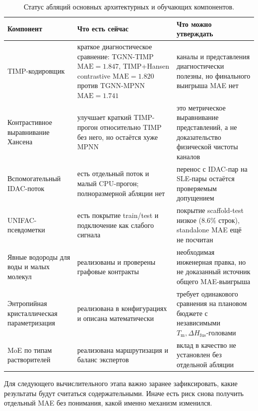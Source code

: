 \documentclass[11pt]{article}
\newcommand{\mae}{\mathrm{MAE}}
\newcommand{\Tm}{T_{\mathrm m}}
\newcommand{\dHfus}{\Delta H_{\mathrm{fus}}}
\theoremstyle{definition}
\begin{document}
\begin{table}[H]
\centering
\caption{Статус абляций основных архитектурных и обучающих компонентов.}
\label{tab:ablation-status}
\small
\begin{tabularx}{\textwidth}{P{0.25\textwidth}P{0.24\textwidth}Y}
\toprule
Компонент & Что есть сейчас & Что можно утверждать \\
\midrule
TIMP-кодировщик & краткое диагностическое сравнение: TGNN-TIMP $\mae=1.847$, TIMP+Hansen contrastive $\mae=1.820$ против TGNN-MPNN $\mae=1.741$ & каналы и представления диагностически полезны, но финального выигрыша MAE нет \\
Контрастивное выравнивание Хансена & улучшает краткий TIMP-прогон относительно TIMP без него, но остаётся хуже MPNN & это метрическое выравнивание представлений, а не доказательство физической чистоты каналов \\
Вспомогательный IDAC-поток & есть отдельный поток и малый CPU-прогон; полноразмерной абляции нет & перенос с IDAC-пар на SLE-пары остаётся проверяемым допущением \\
UNIFAC-псевдометки & есть покрытие train/test и подключение как слабого сигнала & покрытие scaffold-test низкое ($8.6\%$ строк), standalone MAE ещё не посчитан \\
Явные водороды для воды и малых молекул & реализованы и проверены графовые контракты & необходимая инженерная правка, но не доказанный источник общего MAE-выигрыша \\
Энтропийная кристаллическая параметризация & реализована в конфигурациях и описана математически & требует одинакового сравнения на плановом бюджете с независимыми $\Tm,\dHfus$-головами \\
MoE по типам растворителей & реализована маршрутизация и баланс экспертов & вклад в качество не установлен без отдельной абляции \\
\bottomrule
\end{tabularx}
\end{table}

Для следующего вычислительного этапа важно заранее зафиксировать, какие результаты будут считаться содержательными. Иначе есть риск снова получить отдельный MAE без понимания, какой именно механизм изменился.
\end{document}
